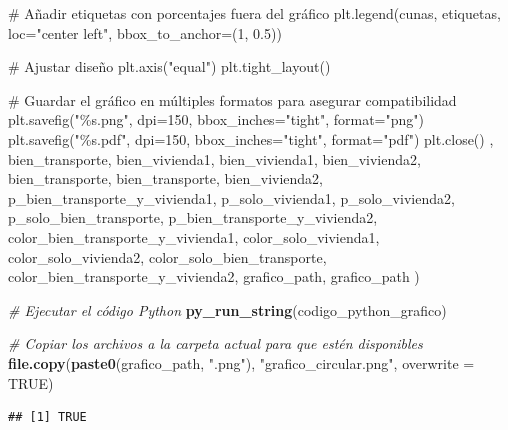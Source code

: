 \documentclass[
]{article}
\newenvironment{Shaded}{\begin{snugshade}}{\end{snugshade}}
\newcommand{\AttributeTok}[1]{\textcolor[rgb]{0.13,0.29,0.53}{#1}}
\newcommand{\CommentTok}[1]{\textcolor[rgb]{0.56,0.35,0.01}{\textit{#1}}}
\newcommand{\ConstantTok}[1]{\textcolor[rgb]{0.56,0.35,0.01}{#1}}
\newcommand{\FunctionTok}[1]{\textcolor[rgb]{0.13,0.29,0.53}{\textbf{#1}}}
\newcommand{\NormalTok}[1]{#1}
\newcommand{\StringTok}[1]{\textcolor[rgb]{0.31,0.60,0.02}{#1}}
\begin{document}
\begin{Shaded}
\begin{Highlighting}[]
\StringTok{\# Añadir etiquetas con porcentajes fuera del gráfico}
\StringTok{plt.legend(cunas, etiquetas, loc="center left", bbox\_to\_anchor=(1, 0.5))}

\StringTok{\# Ajustar diseño}
\StringTok{plt.axis("equal")}
\StringTok{plt.tight\_layout()}

\StringTok{\# Guardar el gráfico en múltiples formatos para asegurar compatibilidad}
\StringTok{plt.savefig("\%s.png", dpi=150, bbox\_inches="tight", format="png")}
\StringTok{plt.savefig("\%s.pdf", dpi=150, bbox\_inches="tight", format="pdf")}
\StringTok{plt.close()}
\StringTok{\textquotesingle{}}\NormalTok{,}
\NormalTok{bien\_transporte, bien\_vivienda1, bien\_vivienda1, bien\_vivienda2, bien\_transporte, bien\_transporte, bien\_vivienda2,}
\NormalTok{p\_bien\_transporte\_y\_vivienda1, p\_solo\_vivienda1, p\_solo\_vivienda2, p\_solo\_bien\_transporte, p\_bien\_transporte\_y\_vivienda2,}
\NormalTok{color\_bien\_transporte\_y\_vivienda1, color\_solo\_vivienda1, color\_solo\_vivienda2, color\_solo\_bien\_transporte, color\_bien\_transporte\_y\_vivienda2,}
\NormalTok{grafico\_path, grafico\_path}
\NormalTok{)}

\CommentTok{\# Ejecutar el código Python}
\FunctionTok{py\_run\_string}\NormalTok{(codigo\_python\_grafico)}

\CommentTok{\# Copiar los archivos a la carpeta actual para que estén disponibles}
\FunctionTok{file.copy}\NormalTok{(}\FunctionTok{paste0}\NormalTok{(grafico\_path, }\StringTok{".png"}\NormalTok{), }\StringTok{"grafico\_circular.png"}\NormalTok{, }\AttributeTok{overwrite =} \ConstantTok{TRUE}\NormalTok{)}
\end{Highlighting}
\end{Shaded}

\begin{verbatim}
## [1] TRUE
\end{verbatim}
\end{document}
